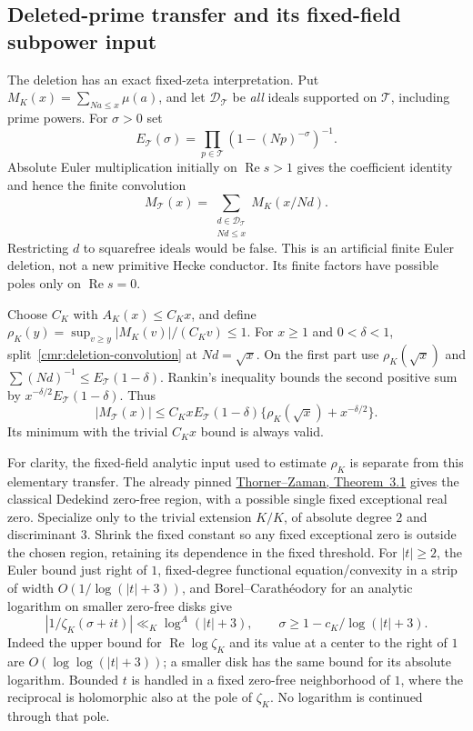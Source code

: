 \subsection{Deleted-prime transfer and its fixed-field subpower input}
\label{cmr:deleted-transfer}
The deletion has an exact fixed-zeta interpretation. Put
$M_K(x)=\sum_{Na\le x}\mu(a)$, and let $\mathcal D_{\mathcal T}$ be
\emph{all} ideals supported on $\mathcal T$, including prime powers.
For $\sigma>0$ set
\[
 E_{\mathcal T}(\sigma)=
       \prod_{p\in\mathcal T}(1-(Np)^{-\sigma})^{-1}.
\]
Absolute Euler multiplication initially on $\operatorname{Re}s>1$
gives the coefficient identity and hence the finite convolution
\begin{equation}\label{cmr:deletion-convolution}
 M_{\mathcal T}(x)=
       \sum_{\substack{d\in\mathcal D_{\mathcal T}\\Nd\le x}}
                         M_K(x/Nd).
\end{equation}
Restricting $d$ to squarefree ideals would be false.
This is an artificial finite Euler deletion, not a new primitive
Hecke conductor. Its finite factors have possible poles only on
$\operatorname{Re}s=0$.

Choose $C_K$ with $A_K(x)\le C_Kx$, and define
$\rho_K(y)=\sup_{v\ge y}|M_K(v)|/(C_Kv)\le1$.
For $x\ge1$ and $0<\delta<1$, split~\eqref{cmr:deletion-convolution}
at $Nd=\sqrt x$. On the first part use $\rho_K(\sqrt x)$ and
$\sum(Nd)^{-1}\le E_{\mathcal T}(1-\delta)$.
Rankin's inequality bounds the second positive sum by
$x^{-\delta/2}E_{\mathcal T}(1-\delta)$. Thus
\begin{equation}\label{cmr:deletion-bound}
 |M_{\mathcal T}(x)|\le C_KxE_{\mathcal T}(1-\delta)
                    \{\rho_K(\sqrt x)+x^{-\delta/2}\}.
\end{equation}
Its minimum with the trivial $C_Kx$ bound is always valid.

For clarity, the fixed-field analytic input used to estimate $\rho_K$
is separate from this elementary transfer. The already pinned
\href{https://doi.org/10.2140/ant.2019.13.1039}{Thorner--Zaman,
Theorem~3.1} gives the classical Dedekind zero-free region, with a
possible single fixed exceptional real zero. Specialize only to the
trivial extension $K/K$, of absolute degree $2$ and discriminant $3$.
Shrink the fixed constant so any fixed exceptional zero is outside the
chosen region, retaining its dependence in the fixed threshold.
For $|t|\ge2$, the Euler bound just right of $1$, fixed-degree
functional equation/convexity in a strip of width $O(1/\log(|t|+3))$,
and Borel--Carath\'eodory for an analytic logarithm on smaller zero-free
disks give
\[
 |1/\zeta_K(\sigma+it)|\ll_K\log^A(|t|+3),\qquad
 \sigma\ge1-c_K/\log(|t|+3).
\]
Indeed the upper bound for $\operatorname{Re}\log\zeta_K$ and its value
at a center to the right of $1$ are $O(\log\log(|t|+3))$; a smaller
disk has the same bound for its absolute logarithm.
Bounded $t$ is handled in a fixed zero-free neighborhood of $1$,
where the reciprocal is holomorphic also at the pole of $\zeta_K$.
No logarithm is continued through that pole.


